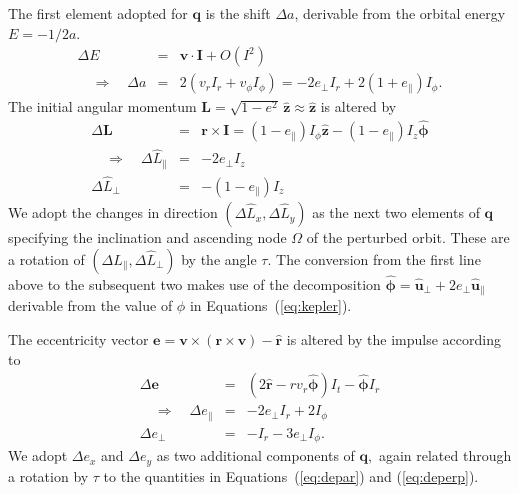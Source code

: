 \documentclass[linenumbers, onecolumn]{aastex631}
\newcommand{\vecI}{\mathbf{I}}
\newcommand{\vece}{\mathbf{e}}
\newcommand{\rhat}{\mathbf{\hat r}}
\newcommand{\phat}{\boldsymbol{\hat\phi}}
\newcommand{\uhat}{\boldsymbol{\hat u}}
\newcommand{\zhat}{\mathbf{\hat z}}
\newcommand{\vecq}{\mathbf{q}}
\newcommand{\vecr}{\mathbf{r}}
\newcommand{\vecv}{\mathbf{v}}
\newcommand{\Lhat}{\hat L}
\begin{document}
The first element adopted for $\vecq$ is the shift $\Delta a$, derivable from the orbital energy $E=-1/2a.$
\begin{eqnarray}
  \Delta E & = &  \vecv \cdot \vecI + O(I^2) \\
  \quad \Rightarrow \quad \Delta a & = & 2\left(v_r I_r + v_\phi I_\phi\right) = -2e_\perp I_r + 2(1+e_\parallel) I_\phi.
  \label{eq:da}
\end{eqnarray}
The initial angular momentum $\mathbf{L} = \sqrt{1-e^2}\,\zhat \approx \zhat$ is altered by
\begin{eqnarray}
  \Delta \mathbf{L} & = & \vecr \times \vecI = (1-e_\parallel) I_\phi \zhat - (1-e_\parallel) I_z \phat \\
  \quad \Rightarrow \quad \Delta \Lhat_\parallel & = & -2e_\perp I_z
  \label{eq:dLpar}\\
  \Delta \Lhat_\perp & = & -(1-e_\parallel)  I_z
                  \label{eq:dLperp}
\end{eqnarray}
We adopt the changes in direction $(\Delta\Lhat_x, \Delta\Lhat_y)$ as the next two elements of $\vecq$ specifying the inclination and ascending node $\Omega$ of the perturbed orbit.  These are a rotation of $(\Delta\Lhat_\parallel, \Delta\Lhat_\perp)$ by the angle $\tau.$  The conversion from the first line above to the subsequent two makes use of the decomposition $\phat=\uhat_\perp + 2e_\perp \uhat_\parallel$ derivable from the value of $\phi$ in Equations~(\ref{eq:kepler}).

The eccentricity vector $\vece = \vecv \times (\vecr \times \vecv) - \rhat$ is altered by the impulse according to
\begin{eqnarray}
  \Delta\vece & = & (2\rhat - rv_r \phat) I_t - \phat I_r \\
\label{eq:depar}
  \quad \Rightarrow \quad \Delta e_\parallel & = &  -2e_\perp I_r + 2 I_\phi \\
\Delta e_\perp & = & -I_r - 3e_\perp I_\phi.
\label{eq:deperp}
\end{eqnarray}
We adopt $\Delta e_x$ and $\Delta e_y$ as two additional components of $\vecq,$ again related through a rotation by $\tau$ to the quantities in Equations~(\ref{eq:depar}) and (\ref{eq:deperp}).
\end{document}
